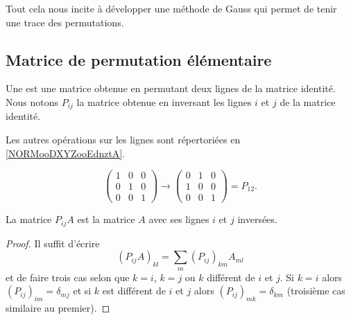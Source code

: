 Tout cela nous incite à développer une méthode de Gauss qui permet de tenir une trace des permutations.

\subsection{Matrice de permutation élémentaire}

\begin{definition}
	Une  est une matrice obtenue en permutant deux lignes de la matrice identité. Nous notons \( P_{ij}\) la matrice obtenue en inversant les lignes \( i\) et \( j\) de la matrice identité.
\end{definition}

Les autres opérations sur les lignes sont répertoriées en \ref{NORMooDXYZooEdnztA}.

\begin{example}
	\begin{equation}
		\begin{pmatrix}
			1 & 0 & 0 \\
			0 & 1 & 0 \\
			0 & 0 & 1
		\end{pmatrix}\to
		\begin{pmatrix}
			0 & 1 & 0 \\
			1 & 0 & 0 \\
			0 & 0 & 1
		\end{pmatrix}=P_{12}.
	\end{equation}
\end{example}

\begin{lemma}
	La matrice \( P_{ij}A\) est la matrice \( A\) avec ses lignes \( i\) et \( j\) inversées.
\end{lemma}

\begin{proof}
	Il suffit d'écrire
	\begin{equation}
		(P_{ij}A)_{kl}=\sum_m(P_{ij})_{km}A_{ml}
	\end{equation}
	et de faire trois cas selon que \( k=i\), \( k=j\) ou \( k\) différent de \( i\) et \( j\). Si \( k=i\) alors \( (P_{ij})_{im}=\delta_{mj}\) et si \( k\) est différent de \( i\) et \( j\) alors \( (P_{ij})_{mk}=\delta_{km}\) (troisième cas similaire au premier).
\end{proof}

